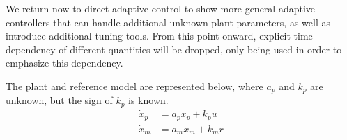 We return now to direct adaptive control to show more general adaptive controllers that can handle additional unknown plant parameters, as well as introduce additional tuning tools.
From this point onward, explicit time dependency of different quantities will be dropped, only being used in order to emphasize this dependency.

\begin{example}\label{example.adaptive.direct_scalar_two}
  The plant and reference model are represented below, where $a_{p}$ and $k_{p}$ are unknown, but the sign of $k_{p}$ is known.
  \begin{align*}
    \dot{x}_{p}&=a_{p}x_{p}+k_{p}u \\
    \dot{x}_{m}&=a_{m}x_{m}+k_{m}r
  \end{align*}


\end{example}
